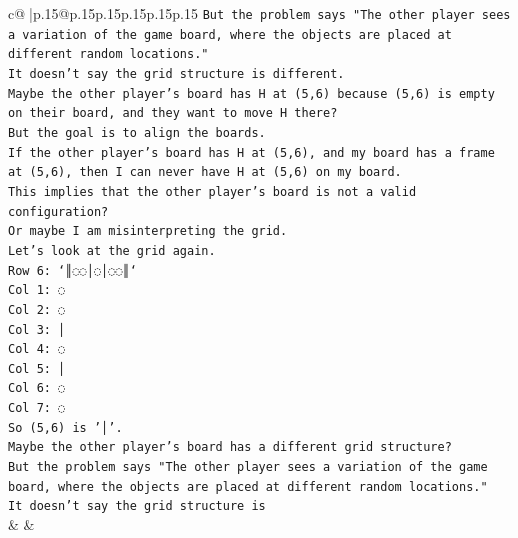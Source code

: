 \documentclass{article}
\begin{document}
{\begin{supertabular}{c@{$\;$}|p{.15\linewidth}@{}p{.15\linewidth}p{.15\linewidth}p{.15\linewidth}p{.15\linewidth}p{.15\linewidth}}
{{{\texttt{But the problem says "The other player sees a variation of the game board, where the objects are placed at different random locations."} \\
\texttt{It doesn't say the grid structure is different.} \\
\texttt{Maybe the other player's board has H at (5,6) because (5,6) is empty on their board, and they want to move H there?} \\
\texttt{But the goal is to align the boards.} \\
\texttt{If the other player's board has H at (5,6), and my board has a frame at (5,6), then I can never have H at (5,6) on my board.} \\
\texttt{This implies that the other player's board is not a valid configuration?} \\
\texttt{Or maybe I am misinterpreting the grid.} \\
\texttt{Let's look at the grid again.} \\
\texttt{Row 6: `║◌◌│◌│◌◌║`} \\
\texttt{Col 1: ◌} \\
\texttt{Col 2: ◌} \\
\texttt{Col 3: │} \\
\texttt{Col 4: ◌} \\
\texttt{Col 5: │} \\
\texttt{Col 6: ◌} \\
\texttt{Col 7: ◌} \\
\texttt{So (5,6) is '│'.} \\
\texttt{Maybe the other player's board has a different grid structure?} \\
\texttt{But the problem says "The other player sees a variation of the game board, where the objects are placed at different random locations."} \\
\texttt{It doesn't say the grid structure is} \\
            }
        }
    }
    & & \\ \\


\end{supertabular}}
\end{document}
